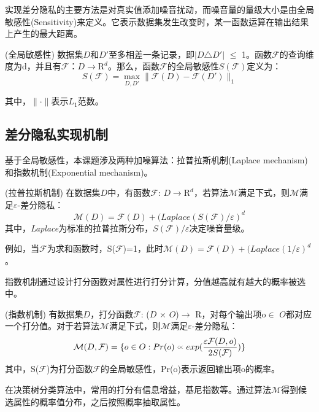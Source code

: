 实现差分隐私的主要方法是对真实值添加噪音扰动，而噪音量的量级大小是由全局敏感性(Sensitivity)来定义。它表示数据集发生改变时，某一函数运算在输出结果上产生的最大距离。

\begin{defn}
	(\textsc{全局敏感性}\supercite{Dwork Calibrating}) 数据集$D$和$D'$至多相差一条记录，即$|D$$\triangle$$D'|$ $\leqslant$ 1。函数$\mathcal{F}$的查询维度为d，并且有$\mathcal{F}$：$D \rightarrow \mathrm{R}^d$。那么，函数$\mathcal{F}$的全局敏感性$S(\mathcal{F})$定义为：
\begin{equation}
\label{eq:res2}
	S(\mathcal{F}) = \max \limits_{D,D'} \| \mathcal{F}(D) - \mathcal{F}(D') \|_{1}
\end{equation}

其中，$\|\cdot\|$表示$L_{1}$范数。
\end{defn}

\subsection{差分隐私实现机制}

基于全局敏感性，本课题涉及两种加噪算法：拉普拉斯机制(Laplace mechanism)和指数机制(Exponential mechanism)。

\begin{thm}
	\label{thm:res1}
	(\textsc{拉普拉斯机制}\supercite{Dwork Calibrating}) 在数据集$D$中，有函数$\mathcal{F}$: $D\rightarrow \mathrm{R}^d$，若算法$\mathcal{M}$满足下式，则$\mathcal{M}$满足$\varepsilon$-差分隐私：
	\begin{equation}
	\mathcal{M}(D) = \mathcal{F}(D) + (\textit{Laplace}(S(\mathcal{F})/ \varepsilon)^d
	\end{equation}
	其中，\textit{Laplace}为标准的拉普拉斯分布，$S(\mathcal{F})/\varepsilon$决定噪音量级。
\end{thm}
例如，当$\mathcal{F}$为求和函数时，S($\mathcal{F}$)=1，此时$\mathcal{M}(D) = \mathcal{F}(D) + (\textit{Laplace}(1/\varepsilon)^d$。

指数机制通过设计打分函数对属性进行打分计算，分值越高就有越大的概率被选中。
\begin{thm}
	\label{thm:res2}
	(\textsc{指数机制}\supercite{exponential}) 有数据集$D$，打分函数$\mathcal{F}$: ($D$ $\times$ $O$)$\rightarrow$ $\mathrm{R}$，对每个输出项o$\in$ $O$都对应一个打分值。对于若算法$\mathcal{M}$满足下式，则$\mathcal{M}$满足$\varepsilon$-差分隐私：
	\begin{equation}
	\mathcal{M}(D,\mathcal{F}) = \{o \in O: Pr(o)\wasypropto exp(\frac{\varepsilon\mathcal{F}(D,o)}{2S(\mathcal{F})}) \}
	\end{equation}
	其中，S($\mathcal{F}$)为打分函数$\mathcal{F}$的全局敏感性，Pr(o)表示返回输出项o的概率。
\end{thm}
在决策树分类算法中，常用的打分有信息增益，基尼指数等。通过算法$\mathcal{M}$得到候选属性的概率值分布，之后按照概率抽取属性。

